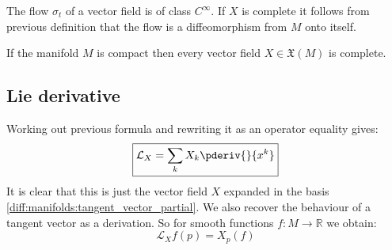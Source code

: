 	
	\begin{property}
		The flow $\sigma_t$ of a vector field is of class $C^\infty$. If $X$ is complete it follows from previous definition that the flow is a diffeomorphism from $M$ onto itself.
	\end{property}
	
	\begin{property}
		If the manifold $M$ is compact then every vector field $X\in\mathfrak{X}(M)$ is complete.
	\end{property}

	
\subsection{Lie derivative}

	
	\begin{formula}[$\dag$]\label{manifolds:ex:lie_derivative_function}
		Working out previous formula and rewriting it as an operator equality gives:
		\begin{equation}
			\label{manifolds:lie_derivative_function_expansion}
			\boxed{\mathcal{L}_X = \sum_kX_k\pderiv{}{x^k}}
		\end{equation}
		It is clear that this is just the vector field $X$ expanded in the basis \ref{diff:manifolds:tangent_vector_partial}. We also recover the behaviour of a tangent vector as a derivation. So for smooth functions $f:M\rightarrow\mathbb{R}$ we obtain:
		\begin{equation}
			\mathcal{L}_Xf(p) = X_p(f)
		\end{equation}
	\end{formula}
	
